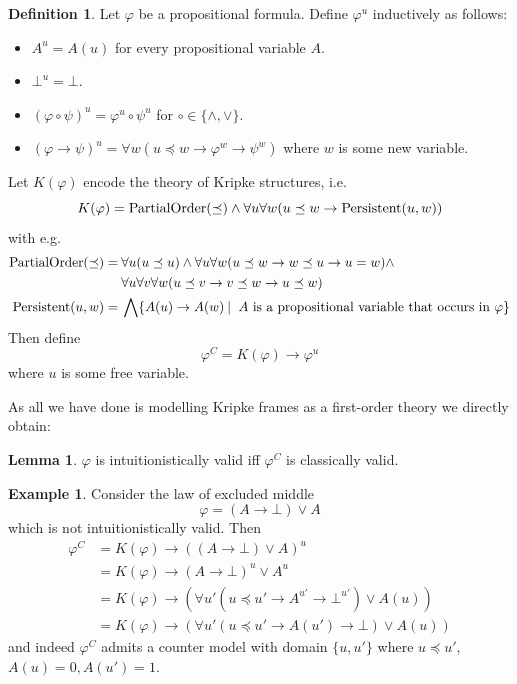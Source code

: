 \documentclass[a4paper,11pt]{report}
\theoremstyle{definition}
\theoremstyle{definition}
\theoremstyle{definition}
\newtheorem{lemma}[theorem]{Lemma}
\theoremstyle{definition}
\theoremstyle{definition}
\newtheorem{definition}[theorem]{Definition}
\theoremstyle{definition}
\newtheorem{example}[theorem]{Example}
\theoremstyle{definition}
\begin{document}
	\begin{definition}
		Let $\varphi$ be a propositional formula. Define $\varphi^{u}$ inductively as follows:
		\begin{itemize}
			\item $A^{u} = A(u)$ for every propositional variable $A$.
			\item $\bot^u = \bot$.
			\item $(\varphi\circ\psi)^u = \varphi^u\circ\psi^u$ for $\circ\in\{\wedge, \vee\}$.
			\item $(\varphi\to \psi)^u = \forall w(u\preceq w\to\varphi^{w}\to\psi^{w})$ where $w$ is some new variable.
		\end{itemize}
		Let $K(\varphi)$ encode the theory of Kripke structures, i.e.
		$$K(\varphi) = \text{\normalfont PartialOrder}(\preceq)\wedge\forall u\forall w(u\preceq w\to \text{\normalfont Persistent}(u, w))$$
		with e.g.
		\begin{align*}
			\text{\normalfont PartialOrder}(\preceq) =&\:\forall u(u\preceq u)\wedge\forall u\forall w(u\preceq w\to w\preceq u\to u = w)\wedge\\&\:\forall u\forall v\forall w(u\preceq v\to v\preceq w\to u\preceq w)\\
			\text{\normalfont Persistent}(u, w)=&\:\bigwedge \{A(u)\to A(w)\:|\: \text{ $A$ is a propositional variable that occurs in $\varphi$}\}
		\end{align*}
		Then define
		$$\varphi^{C} = K(\varphi)\to \varphi^{u}$$
		where $u$ is some free variable.
	\end{definition}
	
	\noindent As all we have done is modelling Kripke frames as a first-order theory we directly obtain:
	
	\begin{lemma}
		$\varphi$ is intuitionistically valid iff $\varphi^C$ is classically valid.
	\end{lemma}

	\begin{example}
		Consider the law of excluded middle $$\varphi = (A\to \bot)\vee A$$ which is not intuitionistically valid. Then
		\begin{align*}
			\varphi^{C} &= K(\varphi)\to ((A\to \bot)\vee A)^u\\
						 &= K(\varphi)\to (A\to \bot)^u\vee A^u\\
						 &= K(\varphi)\to (\forall u'( u\preceq u' \to A^{u'}\to \bot^{u'})\vee A(u))\\
						 &= K(\varphi)\to (\forall u' (u\preceq u' \to A(u')\to \bot)\vee A(u))
		\end{align*}
		and indeed $\varphi^{C}$ admits a counter model with domain $\{u, u'\}$ where $u \preceq u'$, $A(u) = 0, A(u') = 1$.
	\end{example}
	
\end{document}
